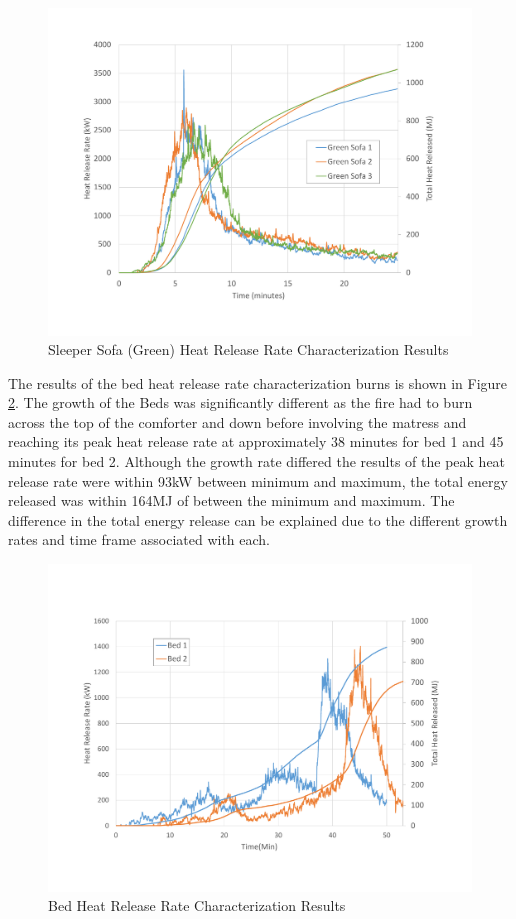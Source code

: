 \documentclass{article}
\begin{document}
\begin{figure}[H]
	\centering
	\includegraphics[height=0.45\textheight]{0_Images/Furniture/Sofa_Green_HRR.pdf}
	\caption{Sleeper Sofa (Green) Heat Release Rate Characterization Results}
	\label{fig:SofaGreenHRR}
\end{figure}

The results of the bed heat release rate characterization burns is shown in Figure \ref{fig:BedHRR}. The growth of the Beds was significantly different as the fire had to burn across the top of the comforter and down before involving the matress and reaching its peak heat release rate at approximately 38 minutes for bed 1 and 45 minutes for bed 2. Although the growth rate differed the results of the peak heat release rate were within 93kW between minimum and maximum, the total energy released was within 164MJ of between the minimum and maximum. The difference in the total energy release can be explained due to the different growth rates and time frame associated with each.

\begin{figure}[H]
	\centering
	\includegraphics[height=0.45\textheight]{0_Images/Furniture/Bed_HRR.pdf}
	\caption{Bed Heat Release Rate Characterization Results}
	\label{fig:BedHRR}
\end{figure}
\end{document}
